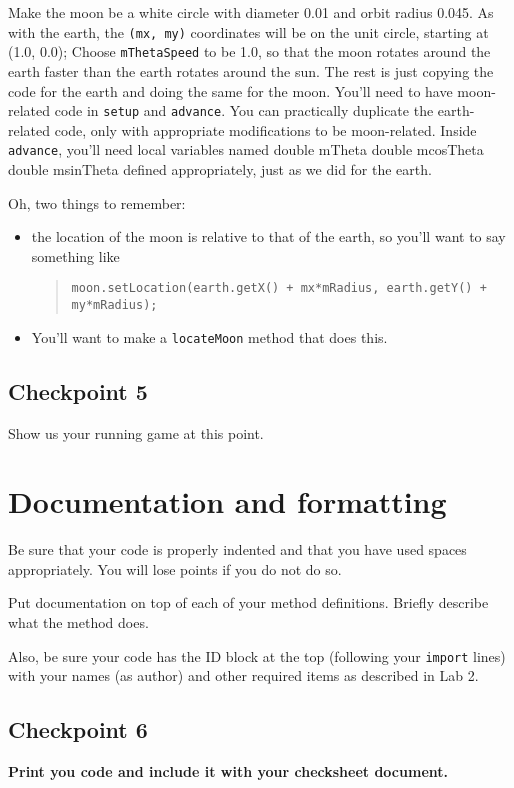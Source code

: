 \documentclass[11pt]{article}
\newenvironment{qv}%
  {\quote
   \verbatim}%
  {\endverbatim
   \endquote}
\begin{document}
Make the moon be a white circle with diameter 0.01
and orbit radius 0.045.
As with the earth, the {\tt (mx, my)} coordinates will be on the unit circle,
starting at (1.0, 0.0);
Choose {\tt mThetaSpeed} to be 1.0,
so that the moon rotates around the earth
faster than the earth rotates around the sun.
The rest is just copying the code for the earth
and doing the same for the moon.
You'll need to have moon-related code in {\tt setup} and {\tt advance}.
You can practically duplicate the earth-related code,
only with appropriate modifications to be moon-related.
Inside \verb'advance',
you'll need local variables named
\begin{qv}
double mTheta
double mcosTheta
double msinTheta
\end{qv}
defined appropriately,
just as we did for the earth.

Oh, two things to remember:
\begin{itemize}
\item
  the location of the moon is relative to that of the earth,
  so you'll want to say something like
\begin{quote}
\begin{verbatim}
moon.setLocation(earth.getX() + mx*mRadius, earth.getY() + my*mRadius);
\end{verbatim}
\end{quote}
\item
  You'll want to make a {\tt locateMoon} method
  that does this.
\end{itemize}

\subsection*{Checkpoint 5}
Show us your running game at this point.

\section*{Documentation and formatting}

Be sure that your code is properly indented
and that you have used spaces appropriately.
You will lose points if you do not do so.

Put documentation on top of each of your method definitions.
Briefly describe what the method does.

Also, be sure your code has the ID block at the top
(following your {\tt import} lines)
with your names (as author) and other required items
as described in Lab 2.

\subsection*{Checkpoint 6}
{\bf
Print you code and include it with your checksheet document.
}
\end{document}
